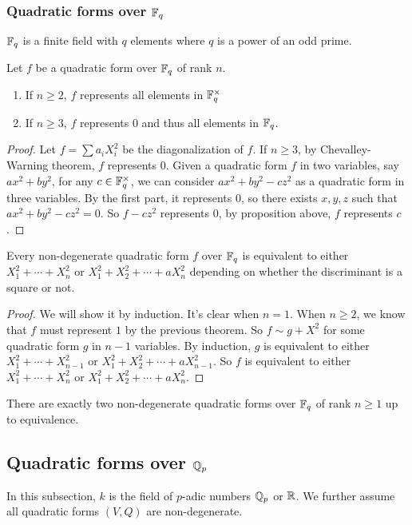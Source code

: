 \documentclass[15pt]{scrartcl}
\begin{document}
\subsubsection*{Quadratic forms over $\mathbb F_q$}
$\mathbb F_q$ is a finite field with $q$ elements where $q$ is a power of an odd prime. 
\begin{theorem}
    Let $f$ be a quadratic form over $\mathbb F_q$ of rank $n$. 
    \begin{enumerate}
        \item If $n\geq 2$, $f$ represents all elements in $\mathbb F_q^\times$
        \item If $n\geq 3$, $f$ represents $0$ and thus all elements in $\mathbb F_q$.
    \end{enumerate}
\end{theorem}
\begin{proof}
    Let $f=\sum a_iX_i^2$ be the diagonalization of $f$. If $n\geq 3$, by Chevalley-Warning theorem, $f$ represents $0$. Given a quadratic form $f$ in two variables, say $ax^2+by^2$, for any $c\in \mathbb F_q^\times$, we can consider $ax^2+by^2-cz^2$ as a quadratic form in three variables. By the first part, it represents $0$, so there exists $x,y,z$ such that $ax^2+by^2-cz^2=0$. So $f-cz^2$ represents $0$, by proposition above, $f$ represents $c$. 
\end{proof}
\begin{theorem}
    Every non-degenerate quadratic form $f$ over $\mathbb F_q$ is equivalent to either $X_1^2+\cdots +X_n^2$ or $X_1^2+X_2^2+\cdots +aX_n^2$ depending on whether the discriminant is a square or not.
\end{theorem}
\begin{proof}
    We will show it by induction. It's clear when $n=1$. When $n\geq 2$, we know that $f$ must represent $1$ by the previous theorem. So $f\sim g+X^2$ for some quadratic form $g$ in $n-1$ variables. By induction, $g$ is equivalent to either $X_1^2+\cdots +X_{n-1}^2$ or $X_1^2+X_2^2+\cdots +aX_{n-1}^2$. So $f$ is equivalent to either $X_1^2+\cdots +X_n^2$ or $X_1^2+X_2^2+\cdots +aX_n^2$.
\end{proof}
\begin{corollary}
    There are exactly two non-degenerate quadratic forms over $\mathbb F_q$ of rank $n\geq 1$ up to equivalence.
\end{corollary}
\subsection{Quadratic forms over $\mathbb Q_p$}
In this subsection, $k$ is the field of $p$-adic numbers $\mathbb Q_p$ or $\mathbb R$. We further assume all quadratic forms $(V,Q)$ are non-degenerate.
\end{document}
